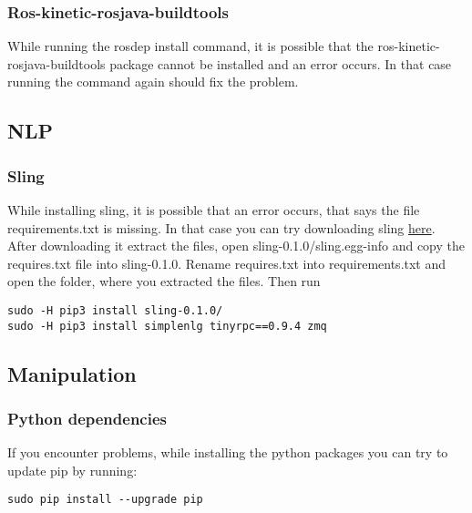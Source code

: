 \documentclass[main.tex]{subfiles}
\begin{document}
	\subsubsection{Ros-kinetic-rosjava-buildtools}
	While running the rosdep install command, it is possible that the ros-kinetic-rosjava-buildtools package cannot be installed and an error occurs. In that case running the command again should fix the problem.


	\subsection{NLP}
	\subsubsection{Sling}
	While installing sling, it is possible that an error occurs, that says the file requirements.txt is missing. In that case you can try downloading sling \href{https://pypi.org/project/sling/#files}{here}. After downloading it extract the files, open sling-0.1.0/sling.egg-info and copy the requires.txt file into sling-0.1.0. Rename requires.txt into requirements.txt and open the folder, where you extracted the files. Then run \\
	\begin{lstlisting}
sudo -H pip3 install sling-0.1.0/
sudo -H pip3 install simplenlg tinyrpc==0.9.4 zmq
\end{lstlisting}
	
	\subsection{Manipulation}
	\subsubsection{Python dependencies}
	If you encounter problems, while installing the python packages you can try to update pip by running:\\
	\begin{lstlisting}
sudo pip install --upgrade pip
\end{lstlisting}	
	
\end{document}
